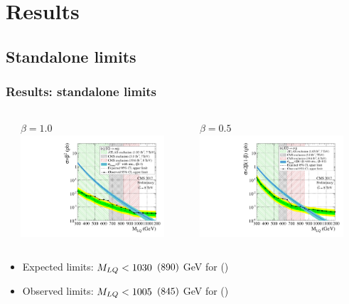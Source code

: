 \documentclass[bigger]{beamer}
\begin{document}
\section{Results}
\label{sec-5}
\subsection{Standalone limits}
\label{sec-5-1}
\begin{frame}
\frametitle{Results: standalone limits}
\label{sec-5-1-1}
\begin{columns} %
\label{sec-5-1-1-1}
\begin{column}{0.5\textwidth}
\label{sec-5-1-1-1-1}

\centering
$\beta = 1.0$
\includegraphics[width=0.875\textwidth]{fig/limits/BR_Sigma_EE.pdf}
\end{column}
\begin{column}{0.5\textwidth}
\label{sec-5-1-1-1-2}

\centering
$\beta = 0.5$
\includegraphics[width=0.875\textwidth]{fig/limits/BR_Sigma_ENu.pdf}
\end{column}
\end{columns}
\label{sec-5-1-1-2}

\begin{itemize}
\item Expected limits: $M_{LQ} < 1030$ $(890)$ GeV for \eejj (\enujj)
\item Observed limits: $M_{LQ} < 1005$ $(845)$ GeV for \eejj (\enujj)
\end{itemize}
\end{frame}
\end{document}
